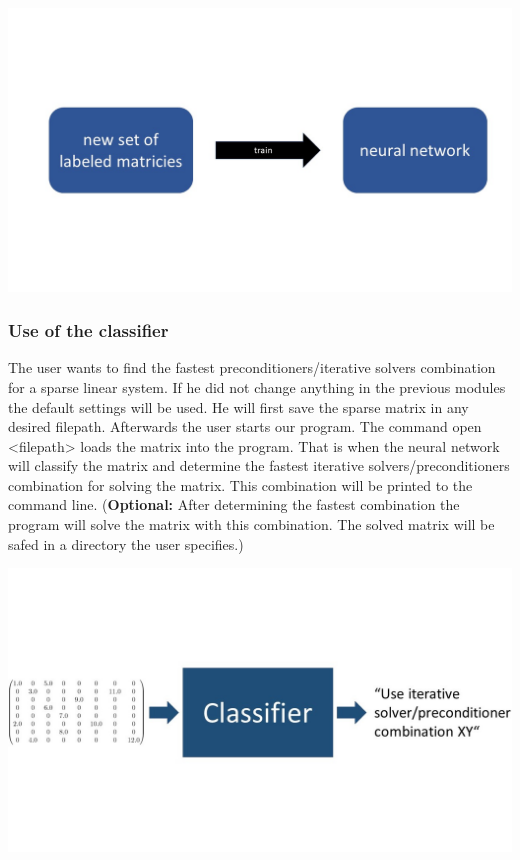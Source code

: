\documentclass[parskip=full]{scrartcl}
\begin{document}
\begin{center}
\includegraphics[width=\textwidth]{neuralNetwork}
\end{center}

\subsubsection{Use of the classifier}

The user wants to find the fastest \glspl{preconditioner}/\glspl{iterative solver} combination for a sparse linear system. If he did not change anything in the previous modules the default settings will be used. He will first save the sparse matrix in any desired filepath. Afterwards the user starts our program. The command open <filepath> loads the matrix into the program. That is when the neural network will classify the matrix and determine the fastest \glspl{iterative solver}/\glspl{preconditioner} combination for solving the matrix. This combination will be printed to the command line. (\textbf{Optional:} After determining the fastest combination the program will solve the matrix with this combination. The solved matrix will be safed in a directory the user specifies.)
\begin{center}
\includegraphics[width=\textwidth]{classifier}
\end{center}
\end{document}
